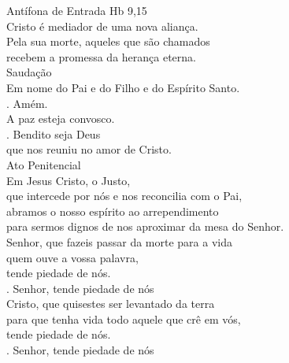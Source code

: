\documentclass{book}
\begin{document}
\begin{flushleft}
    \textcolor{VioletRed2}{Antífona de Entrada}
    \hspace{\fill}
    \textcolor{VioletRed2}{Hb 9,15}
    \vspace{.2cm} \\
    Cristo é mediador de uma nova aliança. \\
    Pela sua morte, aqueles que são chamados \\
    recebem a promessa da herança eterna.
    \vspace{.2cm} \\
    \textcolor{VioletRed2}{Saudação}
    \vspace{.2cm}\\
    Em nome do Pai e do Filho e do Espírito Santo. \\
    {\color{VioletRed2} \Rbar.} Amém. \\
    A paz esteja convosco. \\
    {\color{VioletRed2} \Rbar.} Bendito seja Deus \\
    que nos reuniu no amor de Cristo.
    \vspace{.2cm} \\
    \textcolor{VioletRed2}{Ato Penitencial}
    \vspace{.2cm} \\
    Em Jesus Cristo, o Justo, \\
    que intercede por nós e nos reconcilia com o Pai, \\
    abramos o nosso espírito ao arrependimento \\
    para sermos dignos de nos aproximar da mesa do Senhor.
    \vspace{.2cm} \\
    Senhor, que fazeis passar da morte para a vida \\
    quem ouve a vossa palavra, \\
    tende piedade de nós. \\
    {\color{VioletRed2} \Rbar.} Senhor, tende piedade de nós
    \vspace{.2cm} \\
    Cristo, que quisestes ser levantado da terra \\
    para que tenha vida todo aquele que crê em vós, \\
    tende piedade de nós. \\
    {\color{VioletRed2} \Rbar.} Senhor, tende piedade de nós
    \vspace{.2cm} \\

\end{flushleft}
\end{document}
